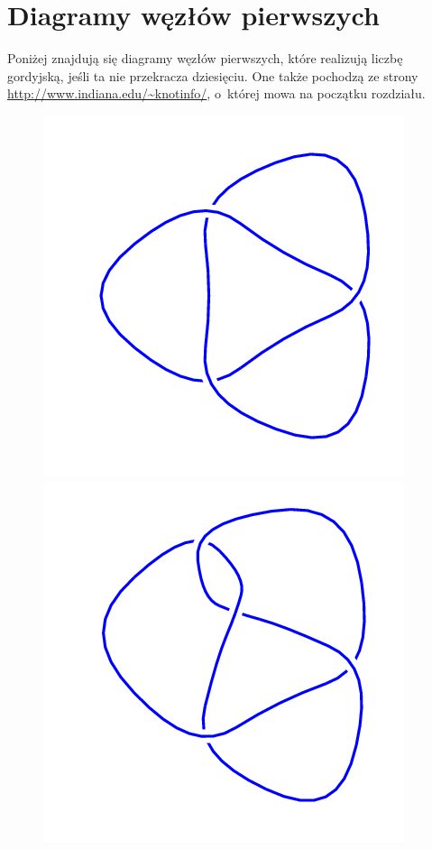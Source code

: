 \section{Diagramy węzłów pierwszych}
\label{sec:table_of_prime_knots}
Poniżej znajdują się diagramy węzłów pierwszych, które realizują liczbę gordyjską, jeśli ta nie przekracza dziesięciu.
One także pochodzą ze strony \url{http://www.indiana.edu/~knotinfo/}, o~której mowa na początku rozdziału.

\begin{figure}[H]
	\begin{minipage}[b]{.18\linewidth}
		\centering
		\includegraphics[width=\linewidth]{../data/3_1.png}
	\end{minipage}
	\begin{minipage}[b]{.18\linewidth}
		\centering
		\includegraphics[width=\linewidth]{../data/4_1.png}

\end{minipage}
\end{figure}
